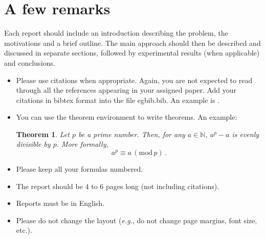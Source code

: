 \documentclass[a4paper,10pt]{article}
\newtheorem{theorem}{Theorem}
\begin{document}
\section{A few remarks}
Each report should include an introduction describing the problem, the motivations and a brief outline. The main approach should then be described and discussed in separate sections, followed by experimental results (when applicable) and conclusions.

\begin{itemize}
\item Please use citations when appropriate. Again, you are not expected to read through all the references appearing in your assigned paper. Add your citations in bibtex format into the file egbib.bib. An example is \cite{neyshabur2017exploring}.
\item You can use the theorem environment to write theorems. An example:
\begin{theorem}
\label{mytheorem}
Let $p$ be a prime number. Then, for any $a \in \mathbb{N}$, $a^p - a$ is evenly divisible by $p$. More formally,
\begin{equation}
a^p \equiv a \, (\mathrm{mod}\, p)\,.
\end{equation}
\end{theorem}
\item Please keep all your formulas numbered.
\item The report should be 4 to 6 pages long (not including citations).
\item Reports must be in English.
\item Please do not change the layout ({\em e.g.}, do not change page margins, font size, etc.).
\end{itemize}

\nocite{*}



\end{document}
